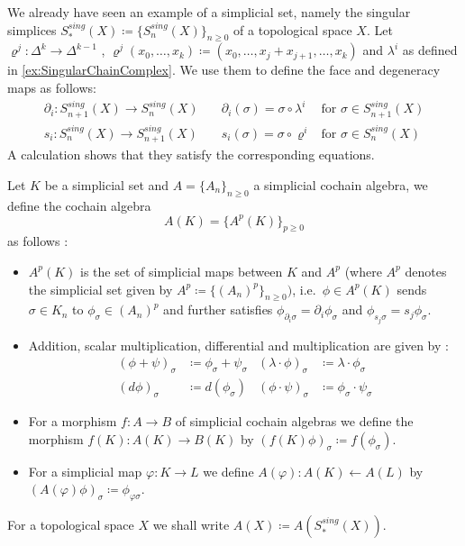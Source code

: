  \begin{Example}
 \label{ex:SingularSimplicesAreSimplicialSets}
    We already have seen an example of a simplicial set, namely the singular simplices 
    $S^{sing}_*(X) \coloneqq {\lbrace S_n^{sing}(X) \rbrace}_{n \geq 0}$ of a topological space $X$.
    Let
    $\varrho^j \colon \Delta^k \to \Delta^{k - 1}$ ,
    ${\varrho^j(x_0, \dotsc , x_k) \coloneqq (x_0 , \dotsc, x_j + x_{j + 1} , \dotsc, x_k)}$ and 
    $\lambda^i$ as defined in \ref{ex:SingularChainComplex}. We use them to define the face
    and degeneracy maps as follows:
    \begin{align*}
     \partial_i \colon S_{n+1}^{sing}(X) \to S_n^{sing}(X) \quad	 &	 \partial_i(\sigma) =
      \sigma \circ \lambda^i  & \text{for $\sigma \in S_{n+1}^{sing}(X)$} 	\\
     s_i \colon S_n^{sing}(X) \to S_{n+1}^{sing}(X) \quad	&	s_i( \sigma) =
     \sigma \circ \varrho^i  & \text{for $\sigma \in S_{n}^{sing}(X)$}
    \end{align*}
    A calculation shows that they satisfy the corresponding equations.
 \end{Example}

 \begin{Definition}
  Let $K$ be a simplicial set and $A = { \lbrace A_n \rbrace}_{n \geq 0}$ a simplicial cochain algebra, we define the cochain algebra
  $$ A(K) = { \lbrace A^p(K) \rbrace}_{ p \geq 0} $$
  as follows :
  \begin{itemize}
   \item $A^p(K)$ is the set of simplicial maps between $K$ and $A^p$ 
   (where $A^p$ denotes the simplicial set given by $A^p \coloneqq {\lbrace (A_n)^p \rbrace}_{n \geq 0})$, i.e.\ 
   $\phi \in A^p(K)$ sends $\sigma \in K_n$ to $\phi_{\sigma} \in {(A_n)}^p$ and further satisfies 
   $\phi_{ \partial_i \sigma} = \partial_i \phi_{\sigma}$ and $\phi_{ s_j \sigma} = s_j \phi_{\sigma}$.
   
   \item Addition, scalar multiplication, differential and multiplication are given by :
   \begin{align*}
    (\phi + \psi)_{\sigma} &\coloneqq \phi_{\sigma} + \psi_{\sigma} & 
    (\lambda \cdot \phi)_{\sigma} &\coloneqq \lambda \cdot \phi_{\sigma} \\
    (d \phi)_{\sigma} &\coloneqq d( \phi_{\sigma}) &  
    {(\phi \cdot \psi)}_{\sigma} &\coloneqq \phi_{\sigma}  \cdot \psi_{\sigma}
   \end{align*}
  
    \item For a morphism $f \colon A \to B$ \; of simplicial cochain algebras we define the morphism
      ${f(K) \colon A(K) \to B(K)}$ by $(f(K) \phi)_{\sigma} \coloneqq f(\phi_{\sigma})$.
    
    \item For a simplicial map $\varphi \colon K \to L$ we define ${A(\varphi) \colon A(K) \gets A(L)}$
      by $(A(\varphi) \phi)_{\sigma} \coloneqq \phi_{\varphi \sigma}$.
  \end{itemize}
  For a topological space $X$ we shall write $A(X) \coloneqq A(S_*^{sing}(X))$.
 \end{Definition}


